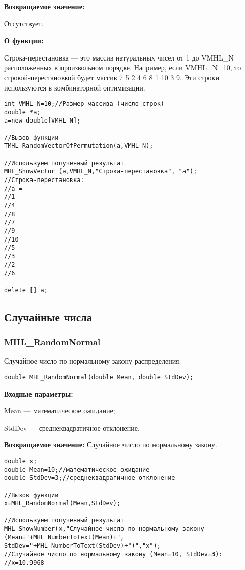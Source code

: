 \documentclass[a4paper,12pt]{article}
\begin{document}
\textbf{Возвращаемое значение:} 

Отсутствует.

\textbf{О функции:}

Строка-перестановка --- это массив натуральных чисел от 1 до VMHL\_N расположенных в произвольном порядке. Например, если VMHL\_N=10, то строкой-перестановкой будет массив 7 5 2 4 6 8 1 10 3 9. Эти строки используются в комбинаторной оптимизации.


\begin{lstlisting}[label=code_use_TMHL_RandomVectorOfPermutation,caption=Пример использования]
int VMHL_N=10;//Размер массива (число строк)
double *a;
a=new double[VMHL_N];

//Вызов функции
TMHL_RandomVectorOfPermutation(a,VMHL_N);

//Используем полученный результат
MHL_ShowVector (a,VMHL_N,"Строка-перестановка", "a");
//Строка-перестановка:
//a =	
//1
//4
//8
//7
//9
//10
//5
//3
//2
//6

delete [] a;
\end{lstlisting}

\subsection{Случайные числа}

\subsubsection{MHL\_RandomNormal}\label{MHL_RandomNormal}

Случайное число по нормальному закону распределения.


\begin{lstlisting}[label=code_syntax_MHL_RandomNormal,caption=Синтаксис]
double MHL_RandomNormal(double Mean, double StdDev);
\end{lstlisting}

\textbf{Входные параметры:}

Mean --- математическое ожидание;

 StdDev --- среднеквадратичное отклонение.

\textbf{Возвращаемое значение:}
Случайное число по нормальному закону.


\begin{lstlisting}[label=code_use_MHL_RandomNormal,caption=Пример использования]
double x;
double Mean=10;//математическое ожидание
double StdDev=3;//среднеквадратичное отклонение

//Вызов функции
x=MHL_RandomNormal(Mean,StdDev);

//Используем полученный результат
MHL_ShowNumber(x,"Случайное число по нормальному закону (Mean="+MHL_NumberToText(Mean)+", StdDev="+MHL_NumberToText(StdDev)+")","x");
//Случайное число по нормальному закону (Mean=10, StdDev=3):
//x=10.9968
\end{lstlisting}
\end{document}
